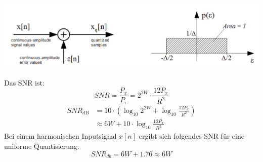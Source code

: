 \begin{center}
	\includegraphics[width=.9\textwidth]{./images/quantization_noise}
\end{center}
Das SNR ist:
\[ SNR = \frac{P_x}{P_\epsilon} = 2^{2W} \cdot \frac{12P_x}{R^2} \]
\[\begin{aligned} SNR_{dB} &= 10 \cdot \left( \log_{10}2^{2W} +
	 \log_{10}\frac{12P_x}{R^2} \right)\\
	 &\approx 6W + 10 \cdot \log_{10}\frac{12P_x}{R^2} 
\end{aligned}\]
Bei einem harmonischen Inputsignal $x[n]$ ergibt sich folgendes SNR für
eine uniforme Quantisierung:
\[ SNR_{db} = 6W +1.76 \approx 6W \]
